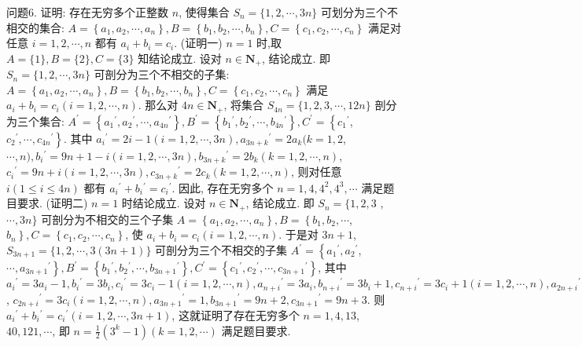 问题6. 证明: 存在无穷多个正整数 $n$, 使得集合 $S_n=\{1,2, \cdots, 3 n\}$ 可划分为三个不相交的集合: $A=\left\{a_1, a_2, \cdots, a_n\right\}, B=\left\{b_1, b_2, \cdots, b_n\right\}, C= \left\{c_1, c_2, \cdots, c_n\right\}$ 满足对任意 $i=1,2, \cdots, n$ 都有 $a_i+b_i=c_i$.
(证明一) $n=1$ 时,取 $A=\{1\}, B=\{2\}, C=\{3\}$ 知结论成立.
设对 $n \in \mathbf{N}_{+}$, 结论成立.
即 $S_n=\{1,2, \cdots, 3 n\}$ 可剖分为三个不相交的子集: $A= \left\{a_1, a_2, \cdots, a_n\right\}, B=\left\{b_1, b_2, \cdots, b_n\right\}, C=\left\{c_1, c_2, \cdots, c_n\right\}$ 满足 $a_i+b_i= c_i(i=1,2, \cdots, n)$. 那么对 $4 n \in \mathbf{N}_{+}$, 将集合 $S_{4 n}=\{1,2,3, \cdots, 12 n\}$ 剖分为三个集合: $A^{\prime}=\left\{a_1{ }^{\prime}, a_2{ }^{\prime}, \cdots, a_{4 n}{ }^{\prime}\right\}, B^{\prime}=\left\{b_1{ }^{\prime}, b_2{ }^{\prime}, \cdots, b_{4 n}{ }^{\prime}\right\}, C^{\prime}=\left\{c_1{ }^{\prime}\right.$, $\left.c_2{ }^{\prime}, \cdots, c_{4 n}{ }^{\prime}\right\}$. 其中 $a_i{ }^{\prime}=2 i-1(i=1,2, \cdots, 3 n), a_{3 n+k}{ }^{\prime}=2 a_k(k=1,2$, $\cdots, n), b_i{ }^{\prime}=9 n+1-i(i=1,2, \cdots, 3 n), b_{3 n+k}{ }^{\prime}=2 b_k(k=1,2, \cdots, n)$, $c_i{ }^{\prime}=9 n+i(i=1,2, \cdots, 3 n), c_{3 n+k}{ }^{\prime}=2 c_k(k=1,2, \cdots, n)$, 则对任意 $i(1 \leqslant i \leqslant 4 n)$ 都有 $a_i{ }^{\prime}+b_i{ }^{\prime}=c_i{ }^{\prime}$. 因此, 存在无穷多个 $n=1,4,4^2, 4^3, \cdots$ 满足题目要求.
(证明二) $n=1$ 时结论成立.
设对 $n \in \mathbf{N}_{+}$, 结论成立.
即 $S_n=\{1,2,3$ , $\cdots, 3 n\}$ 可剖分为不相交的三个子集 $A=\left\{a_1, a_2, \cdots, a_n\right\}, B=\left\{b_1, b_2, \cdots\right.$,
$\left.b_n\right\}, C=\left\{c_1, c_2, \cdots, c_n\right\}$, 使 $a_i+b_i=c_i(i=1,2, \cdots, n)$. 于是对 $3 n+1$, $S_{3 n+1}=\{1,2, \cdots, 3(3 n+1)\}$ 可剖分为三个不相交的子集 $A^{\prime}=\left\{a_1{ }^{\prime}, a_2{ }^{\prime}\right.$, $\left.\cdots, a_{3 n+1}{ }^{\prime}\right\}, B^{\prime}=\left\{b_1{ }^{\prime}, b_2{ }^{\prime}, \cdots, b_{3 n+1}{ }^{\prime}\right\}, C^{\prime}=\left\{c_1{ }^{\prime}, c_2{ }^{\prime}, \cdots, c_{3 n+1}{ }^{\prime}\right\}$, 其中 $a_i{ }^{\prime}=3 a_i-1, b_i{ }^{\prime}=3 b_i, c_i{ }^{\prime}=3 c_i-1(i=1,2, \cdots, n), a_{n+i}{ }^{\prime}=3 a_i, b_{n+i}{ }^{\prime}= 3 b_i+1, c_{n+i}{ }^{\prime}=3 c_i+1(i=1,2, \cdots, n), a_{2 n+i}{ }^{\prime}=3 a_i+1, b_{2 n+i}{ }^{\prime}=3 b_i-1$, $c_{2 n+i}{ }^{\prime}=3 c_i(i=1,2, \cdots, n), a_{3 n+1}{ }^{\prime}=1, b_{3 n+1}{ }^{\prime}=9 n+2, c_{3 n+1}{ }^{\prime}=9 n+3$. 则 $a_i{ }^{\prime}+b_i{ }^{\prime}=c_i{ }^{\prime}(i=1,2, \cdots, 3 n+1)$, 这就证明了存在无穷多个 $n=1,4,13$, $40,121, \cdots$, 即 $n=\frac{1}{2}\left(3^k-1\right)(k=1,2, \cdots)$ 满足题目要求.



